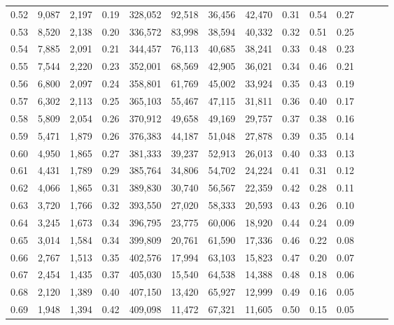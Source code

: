 \begin{tabular}{rrrrrrrrrrrrrr}
0.52 &   9,087 &  2,197 &  0.19 &  328,052 &   92,518 &  36,456 &  42,470 &  0.31 &  0.54 &      0.27 \\
0.53 &   8,520 &  2,138 &  0.20 &  336,572 &   83,998 &  38,594 &  40,332 &  0.32 &  0.51 &      0.25 \\
0.54 &   7,885 &  2,091 &  0.21 &  344,457 &   76,113 &  40,685 &  38,241 &  0.33 &  0.48 &      0.23 \\
0.55 &   7,544 &  2,220 &  0.23 &  352,001 &   68,569 &  42,905 &  36,021 &  0.34 &  0.46 &      0.21 \\
0.56 &   6,800 &  2,097 &  0.24 &  358,801 &   61,769 &  45,002 &  33,924 &  0.35 &  0.43 &      0.19 \\
0.57 &   6,302 &  2,113 &  0.25 &  365,103 &   55,467 &  47,115 &  31,811 &  0.36 &  0.40 &      0.17 \\
0.58 &   5,809 &  2,054 &  0.26 &  370,912 &   49,658 &  49,169 &  29,757 &  0.37 &  0.38 &      0.16 \\
0.59 &   5,471 &  1,879 &  0.26 &  376,383 &   44,187 &  51,048 &  27,878 &  0.39 &  0.35 &      0.14 \\
0.60 &   4,950 &  1,865 &  0.27 &  381,333 &   39,237 &  52,913 &  26,013 &  0.40 &  0.33 &      0.13 \\
0.61 &   4,431 &  1,789 &  0.29 &  385,764 &   34,806 &  54,702 &  24,224 &  0.41 &  0.31 &      0.12 \\
0.62 &   4,066 &  1,865 &  0.31 &  389,830 &   30,740 &  56,567 &  22,359 &  0.42 &  0.28 &      0.11 \\
0.63 &   3,720 &  1,766 &  0.32 &  393,550 &   27,020 &  58,333 &  20,593 &  0.43 &  0.26 &      0.10 \\
0.64 &   3,245 &  1,673 &  0.34 &  396,795 &   23,775 &  60,006 &  18,920 &  0.44 &  0.24 &      0.09 \\
0.65 &   3,014 &  1,584 &  0.34 &  399,809 &   20,761 &  61,590 &  17,336 &  0.46 &  0.22 &      0.08 \\
0.66 &   2,767 &  1,513 &  0.35 &  402,576 &   17,994 &  63,103 &  15,823 &  0.47 &  0.20 &      0.07 \\
0.67 &   2,454 &  1,435 &  0.37 &  405,030 &   15,540 &  64,538 &  14,388 &  0.48 &  0.18 &      0.06 \\
0.68 &   2,120 &  1,389 &  0.40 &  407,150 &   13,420 &  65,927 &  12,999 &  0.49 &  0.16 &      0.05 \\
0.69 &   1,948 &  1,394 &  0.42 &  409,098 &   11,472 &  67,321 &  11,605 &  0.50 &  0.15 &      0.05 \\

\end{tabular}
